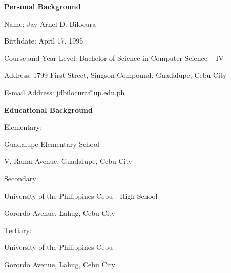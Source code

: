 \begin{profile}
\noindent \textbf{Personal Background}

\noindent Name: Jay Arnel D. Bilocura

\noindent Birthdate: April 17, 1995

\noindent Course and Year Level: Bachelor of Science in Computer Science – IV

\noindent Address: 1799 First Street, Singson Compound, Guadalupe, Cebu City

\noindent E-mail Address: jdbilocura@up.edu.ph

\bigskip
\noindent \textbf{Educational Background}

\noindent Elementary:

Guadalupe Elementary School

V. Rama Avenue, Guadalupe, Cebu City

\noindent Secondary:

University of the Philippines Cebu - High School

Gorordo Avenue, Lahug, Cebu City

\noindent Tertiary:

University of the Philippines Cebu

Gorordo Avenue, Lahug, Cebu City

\end{profile}
